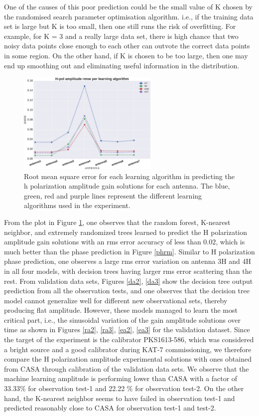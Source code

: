 One of the causes of this poor prediction could be the small value of K chosen by the randomised search parameter optimisation algorithm. i.e., if the training data set is large but K is too small, then one still runs the risk of overfitting. For example, for K = 3 and a really large data set, there is high  chance that two noisy data points close enough to each other can outvote the correct data points in some region. On the other hand, if K is chosen to be too large, then one may end up smoothing out and eliminating useful  information in the distribution. 
\begin{figure}[H]
  \centering
    \includegraphics[width=0.6\textwidth]{images/Hpol-amp.eps}
    \caption{Root mean square error for each learning algorithm in predicting the h polarization amplitude gain solutions for each antenna. The blue, green, red and purple lines represent the different learning algorithms used in the experiment.}
  \label{amprm}
 \end{figure} 

From the plot in Figure \ref{amprm}, one observes that the random forest, K-nearest neighbor, and extremely randomized trees learned to predict the H polarization amplitude gain solutions with an rms error accuracy of less than $0.02$, which is much better than the phase prediction in Figure \ref{phrm}. Similar to H polarization phase prediction, one observes a large rms error variation on antenna 3H and 4H in all four models, with decision trees having larger rms error scattering than the rest. From validation data sets, Figures \ref{da2}, \ref{da3} show the decision tree output prediction from all the observation tests, and one observes that the decision tree model cannot generalize well for different new observational sets, thereby producing flat amplitude. However, these models managed to learn the most critical part, i.e., the sinusoidal variation of the gain amplitude solutions over time as shown in Figures \ref{ra2}, \ref{ra3}, \ref{ea2}, \ref{ea3} for the validation dataset. Since the target of the experiment is the calibrator PKS1613-586, which was considered a bright source and a good calibrator during KAT-7 commissioning, we therefore compare the H polarization amplitude experimental solutions with ones obtained from CASA through calibration of the validation data sets. We observe that the machine learning amplitude is performing lower than CASA with a factor of 33.33$\%$ for observation test-1 and 22.22 $\%$ for observation test-2. On the other hand, the K-nearest neighbor seems to have failed in observation test-1 and predicted reasonably close to CASA for observation test-1 and test-2.

